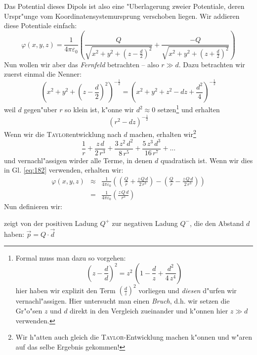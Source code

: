 Das Potential dieses Dipols ist also eine "Uberlagerung zweier
Potentiale, deren Urspr"unge vom Koordinatensystemursprung verschoben
liegen. Wir addieren diese Potentiale einfach:
\begin{equation}
   \label{eq:182}
   \varphi(x,y,z) = \frac{1}{4\pi\varepsilon_0} \left ( \frac{Q}{\sqrt{x^2
          + y^2 + (z-\frac{d}{2})^2}} + \frac{-Q}{\sqrt{x^2
          + y^2 + (z+\frac{d}{2})^2}} \right )
\end{equation}
Nun wollen wir aber das \emph{Fernfeld}
betrachten -- also $r \gg d$. Dazu betrachten wir zuerst einmal die Nenner:
\begin{equation*}
   \label{eq:187}
  \left (   x^2 + y^2 + (z-\frac{d}{2})^2 \right )^{-\frac{1}{2}} =
  \left ( x^2 + y^2 + z^2 -dz + \frac{d^2}{4} \right )^{-\frac{1}{2}}
\end{equation*}
weil $d$ gegen"uber $r$ so klein ist, k"onne wir $d^2 \approx 0$
setzen\footnote{Formal muss man dazu so vorgehen:
$$
(z - \frac{d}{d})^2 = z^2\, (1 - \frac{d}{z} + \frac{d^2}{4\, z^4})
$$
hier haben wir explizit den Term $\left ( \frac{d}{z} \right )^2$
vorliegen und \emph{diesen} d"urfen wir vernachl"assigen. Hier
untersucht man einen \emph{Bruch}, d.h. wir setzen die Gr"o"sen $z$
und $d$ direkt in den Vergleich zueinander und k"onnen hier $z \gg d$
verwenden.}  und erhalten
\begin{equation*}
   \label{eq:189}
     \left ( r^2 -dz  \right )^{-\frac{1}{2}}
\end{equation*}
Wenn wir die \textsc{Taylor}entwicklung nach $d$ machen, erhalten
wir\footnote{Wir h"atten auch gleich die \textsc{Taylor}-Entwicklung
  machen k"onnen und w"aren auf das selbe Ergebnis gekommen!}
\begin{equation*}
   \label{eq:190}
\frac{1}{r}+\frac{z\,d}{2\,{r}^{3}}+\frac{3\,{z}^{2}\,{d}^{2}}{8\,{r}^{5}}+\frac{5\,{z}^{3}\,{d}^{3}}{16\,{r}^{7}}+...
\end{equation*}
und vernachl"assigen wirder alle Terme, in denen $d$ quadratisch
ist. Wenn wir dies in Gl. \eqref{eq:182} verwenden, erhalten wir:
\begin{eqnarray}
\nonumber
   \varphi(x,y,z) &\approx&
\frac{1}{4\pi\varepsilon_0} \left
   (  \left ( \frac{Q}{r}+\frac{z\,Q\,d}{2\,{r}^{3}} \right )
-
\left ( \frac{Q}{r}-\frac{z\,Q\,d}{2\,{r}^{3}} \right )
\right )\\
   \label{eq:191}
&=&
\frac{1}{4\pi\varepsilon_0} \left
   ( \frac{z\,Q\,d}{{r}^{3}} \right )
\end{eqnarray}
Nun definieren wir:
\begin{Def}
    zeigt von der positiven Ladung $Q^+$ zur
   negativen Ladung $Q^-$, die den Abstand $d$ haben: $\vec p = Q
   \cdot \vec d$
\end{Def}

